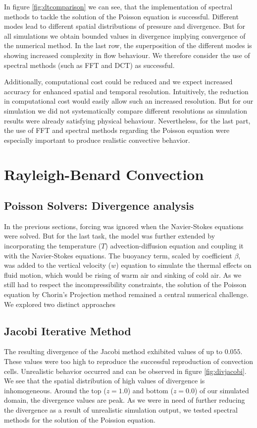 In figure \ref{fig:dtcomparison} we can see, that the implementation of spectral methods to tackle the solution of the Poisson equation is successful.
Different modes lead to different spatial distributions of pressure and divergence.
But for all simulations we obtain bounded values in divergence implying convergence of the numerical method.
In the last row, the superposition of the different modes is showing increased complexity in flow behaviour.
We therefore consider the use of spectral methods (such as FFT and DCT) as successful.

Additionally, computational cost could be reduced and we expect increased accuracy for enhanced spatial and temporal resolution.
Intuitively, the reduction in computational cost would easily allow such an increased resolution.
But for our simulation we did not systematically compare different resolutions as simulation results were already satisfying physical behaviour.
Nevertheless, for the last part, the use of FFT and spectral methods regarding the Poisson equation were especially important to produce realistic convective behavior.


\section{Rayleigh-Benard Convection}

\subsection{Poisson Solvers: Divergence analysis}\label{sec:poisson solver}
In the previous sections, forcing was ignored when the Navier-Stokes equations were solved.
But for the last task, the model was further extended by incorporating the temperature ($T$) advection-diffusion equation and coupling it with the Navier-Stokes equations. The buoyancy term, scaled by coefficient $\beta$, was added to the vertical velocity ($w$) equation to simulate the thermal effects on fluid motion, which would be rising of warm air and sinking of cold air.
As we still had to respect the incompressibility constraints, the solution of the Poisson equation by Chorin's Projection method remained a central numerical challenge.
We explored two distinct approaches

\subsection*{Jacobi Iterative Method}

The resulting divergence of the Jacobi method exhibited values of up to $0.055$. 
These values were too high to reproduce the successful reproduction of convection cells.
Unrealistic behavior occurred and can be observed in figure \ref{fig:divjacobi}.
We see that the spatial distribution of high values of divergence is inhomogeneous.
Around the top ($z=1.0$) and bottom ($z=0.0$) of our simulated domain, the divergence values are peak.
As we were in need of further reducing the divergence as a result of unrealistic simulation output, we tested spectral methods for the solution of the Poission equation.

